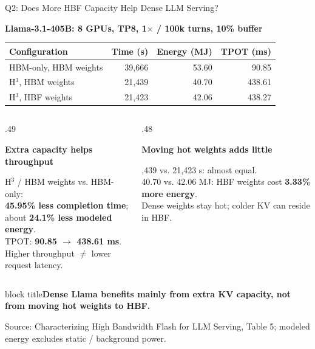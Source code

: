 \documentclass[aspectratio=169,10pt]{beamer}
\newcommand{\takeaway}[1]{\par\vspace{.12cm}\begin{beamercolorbox}[rounded=true,sep=.12cm,wd=\linewidth]{block title}\small\bfseries #1\end{beamercolorbox}}
\newcommand{\src}[1]{\par\vfill{\fontsize{7}{8}\selectfont\color{Muted}Source: Characterizing High Bandwidth Flash for LLM Serving, #1.}\par}
\newcommand{\head}[1]{\par{\color{Accent}\bfseries #1}\par\smallskip}
\begin{document}
\begin{frame}[t]{Q2: Does More HBF Capacity Help Dense LLM Serving?}

\head{Llama-3.1-405B: 8 GPUs, TP8, 1$\times$ / 100k turns, 10\% buffer}
\begin{tabularx}{\textwidth}{@{}Xrrr@{}}\toprule
Configuration & Time (s)& Energy (MJ)& TPOT (ms)\\\midrule
HBM-only, HBM weights&39,666&53.60&90.85\\
H$^3$, HBM weights&21,439&40.70&438.61\\
H$^3$, HBF weights&21,423&42.06&438.27\\\bottomrule
\end{tabularx}
\par\vspace{.2cm}
\begin{columns}[T,onlytextwidth]
\begin{column}{.49\textwidth}
\head{Extra capacity helps throughput}
H$^3$ / HBM weights vs. HBM-only:\\
\textbf{45.95\% less completion time};\\
about \textbf{24.1\% less modeled energy}.\\[.13cm]
TPOT: \textbf{90.85 $\rightarrow$ 438.61 ms}.\\
Higher throughput $\neq$ lower request latency.
\end{column}
\begin{column}{.48\textwidth}
\head{Moving hot weights adds little}
21,439 vs. 21,423 s: almost equal.\\
40.70 vs. 42.06 MJ: HBF weights cost \textbf{3.33\% more energy}.\\[.13cm]
Dense weights stay hot; colder KV can reside in HBF.
\end{column}
\end{columns}
\takeaway{Dense Llama benefits mainly from extra KV capacity, not from moving hot weights to HBF.}

\src{Table 5; modeled energy excludes static / background power}
\end{frame}
\end{document}
